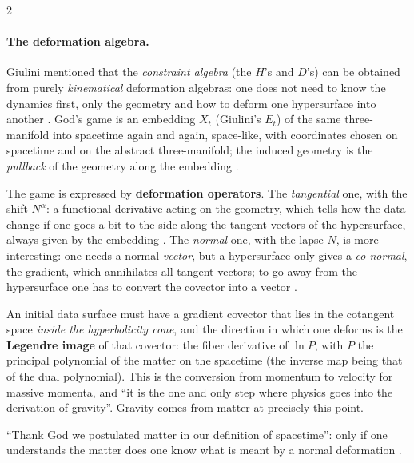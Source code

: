 \begin{paracol}{2}
\paragraph{The deformation algebra.} Giulini mentioned that the \emph{constraint algebra} (the $H$'s and $D$'s) can be obtained from purely \emph{kinematical} deformation algebras: one does not need to know the dynamics first, only the geometry and how to deform one hypersurface into another . God's game is an embedding $X_t$ (Giulini's $E_t$) of the same three-manifold into spacetime again and again, space-like, with coordinates chosen on spacetime and on the abstract three-manifold; the induced geometry is the \emph{pullback} of the geometry along the embedding .

The game is expressed by \textbf{deformation operators}. The \emph{tangential} one, with the shift $N^\alpha$: a functional derivative acting on the geometry, which tells how the data change if one goes a bit to the side along the tangent vectors of the hypersurface, always given by the embedding . The \emph{normal} one, with the lapse $N$, is more interesting: one needs a normal \emph{vector}, but a hypersurface only gives a \emph{co-normal}, the gradient, which annihilates all tangent vectors; to go away from the hypersurface one has to convert the covector into a vector .

\begin{proposition}\label{prop:c26-normal}
An initial data surface must have a gradient covector that lies in the cotangent space \emph{inside the hyperbolicity cone}, and the direction in which one deforms is the \textbf{Legendre image} of that covector: the fiber derivative of $\ln P$, with $P$ the principal polynomial of the matter on the spacetime (the inverse map being that of the dual polynomial). This is the conversion from momentum to velocity for massive momenta, and ``it is the one and only step where physics goes into the derivation of gravity''. Gravity comes from matter at precisely this point.
\end{proposition}

``Thank God we postulated matter in our definition of spacetime'': only if one understands the matter does one know what is meant by a normal deformation .


\end{paracol}
